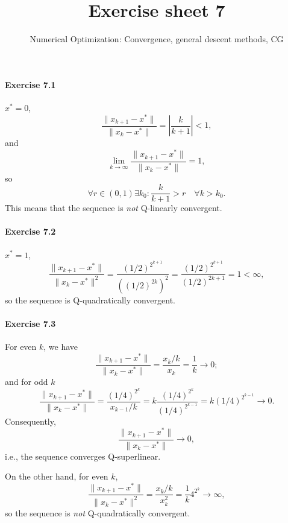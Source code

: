
\title{Exercise sheet 7}
\subtitle{Numerical Optimization: Convergence, general descent methods, CG}
\usepackage{algorithm} %
\usepackage{algpseudocode}

\maketitle

\paragraph{Exercise 7.1} %
$x^* = 0$,
\[
\frac{\|x_{k+1}-x^*\|}{\|x_k-x^*\|} = \left|\frac{k}{k+1}\right| < 1,
\]
and
\[
\lim_{k\to\infty} \frac{\|x_{k+1}-x^*\|}{\|x_k-x^*\|} = 1,
\]
so
\[
\forall r\in(0,1) \exists k_0: \frac{k}{k+1} > r \quad\forall k>k_0.
\]
This means that the sequence is \emph{not} Q-linearly convergent.


\paragraph{Exercise 7.2} %
$x^* = 1$,
\[
\frac{\|x_{k+1}-x^*\|}{\|x_k-x^*\|^2}
= \frac{(1/2)^{2^{k+1}}}{((1/2)^{2k})^2}
= \frac{(1/2)^{2^{k+1}}}{(1/2)^{2k+1}}
= 1 < \infty,
\]
so the sequence is Q-quadratically convergent.


\paragraph{Exercise 7.3} %
For even $k$, we have
\[
\frac{\|x_{k+1}-x^*\|}{\|x_k-x^*\|}
= \frac{x_k/k}{x_k}
= \frac{1}{k}
\to 0;
\]
and for odd $k$
\[
\frac{\|x_{k+1}-x^*\|}{\|x_k-x^*\|}
= \frac{(1/4)^{2^k}}{x_{k-1}/k}
= k \frac{(1/4)^{2^k}}{(1/4)^{2^{k-1}}}
= k (1/4)^{2^{k-1}}
\to 0.
\]
Consequently,
\[
\frac{\|x_{k+1}-x^*\|}{\|x_k-x^*\|} \to 0,
\]
i.e., the sequence converges Q-superlinear.

On the other hand, for even $k$,
\[
\frac{\|x_{k+1}-x^*\|}{\|x_k-x^*\|^2}
= \frac{x_k/k}{x_k^2} = \frac{1}{k}4^{2^k} \to \infty,
\]
so the sequence is \emph{not} Q-quadratically convergent.

